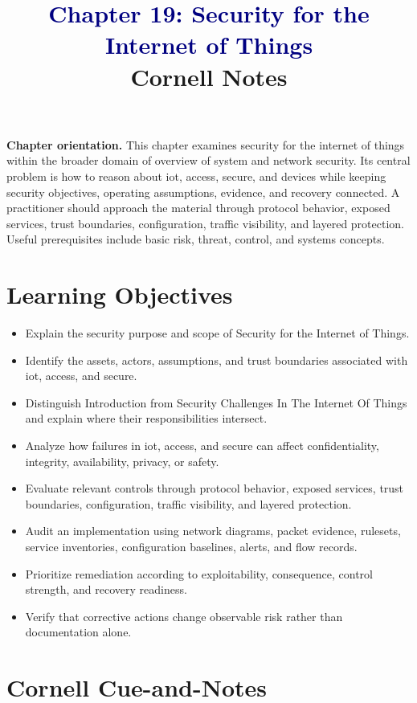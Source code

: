 \documentclass[11pt]{article}
\title{\textcolor{Navy}{Chapter 19: Security for the Internet of Things}\\[2mm]\large Cornell Notes}
\author{}
\date{}
\begin{document}
\maketitle
\thispagestyle{fancy}
\vspace{-1.5em}
\begin{orientationbox}
\textbf{Chapter orientation.} This chapter examines security for the internet of things within the broader domain of overview of system and network security. Its central problem is how to reason about iot, access, secure, and devices while keeping security objectives, operating assumptions, evidence, and recovery connected. A practitioner should approach the material through protocol behavior, exposed services, trust boundaries, configuration, traffic visibility, and layered protection. Useful prerequisites include basic risk, threat, control, and systems concepts.
\end{orientationbox}
\section*{Learning Objectives}
\begin{itemize}
\item Explain the security purpose and scope of Security for the Internet of Things.
\item Identify the assets, actors, assumptions, and trust boundaries associated with iot, access, and secure.
\item Distinguish Introduction from Security Challenges In The Internet Of Things and explain where their responsibilities intersect.
\item Analyze how failures in iot, access, and secure can affect confidentiality, integrity, availability, privacy, or safety.
\item Evaluate relevant controls through protocol behavior, exposed services, trust boundaries, configuration, traffic visibility, and layered protection.
\item Audit an implementation using network diagrams, packet evidence, rulesets, service inventories, configuration baselines, alerts, and flow records.
\item Prioritize remediation according to exploitability, consequence, control strength, and recovery readiness.
\item Verify that corrective actions change observable risk rather than documentation alone.
\end{itemize}
\section*{Cornell Cue-and-Notes}
\end{document}
